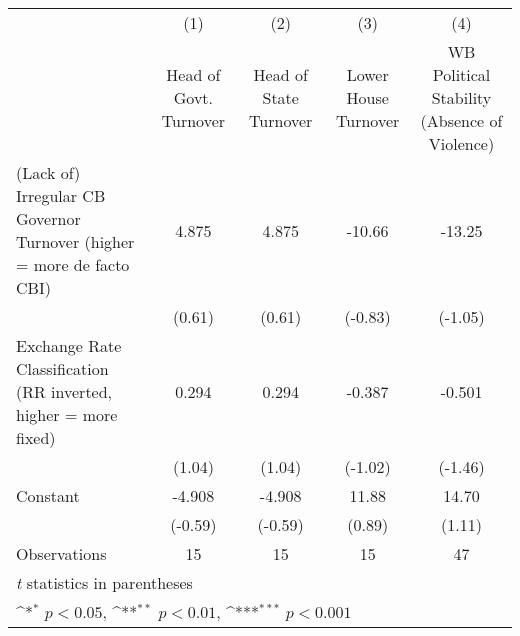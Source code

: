 {
\def\sym#1{\ifmmode^{#1}\else\(^{#1}\)\fi}
\begin{tabular*}{\linewidth}{@{\hskip\tabcolsep\extracolsep\fill}l*{4}{c}}
\toprule
                &\multicolumn{1}{c}{(1)}&\multicolumn{1}{c}{(2)}&\multicolumn{1}{c}{(3)}&\multicolumn{1}{c}{(4)}\\
                &\multicolumn{1}{c}{Head of Govt. Turnover}&\multicolumn{1}{c}{Head of State Turnover}&\multicolumn{1}{c}{Lower House Turnover}&\multicolumn{1}{c}{WB Political Stability (Absence of Violence)}\\
\midrule
(Lack of) Irregular CB Governor Turnover (higher = more de facto CBI)&    4.875         &    4.875         &   -10.66         &   -13.25         \\
                &   (0.61)         &   (0.61)         &  (-0.83)         &  (-1.05)         \\
\addlinespace
Exchange Rate Classification (RR inverted, higher = more fixed)&    0.294         &    0.294         &   -0.387         &   -0.501         \\
                &   (1.04)         &   (1.04)         &  (-1.02)         &  (-1.46)         \\
\addlinespace
Constant        &   -4.908         &   -4.908         &    11.88         &    14.70         \\
                &  (-0.59)         &  (-0.59)         &   (0.89)         &   (1.11)         \\
\midrule
Observations    &       15         &       15         &       15         &       47         \\
\bottomrule
\multicolumn{5}{l}{\footnotesize \textit{t} statistics in parentheses}\\
\multicolumn{5}{l}{\footnotesize \sym{*} \(p<0.05\), \sym{**} \(p<0.01\), \sym{***} \(p<0.001\)}\\
\end{tabular*}
}

